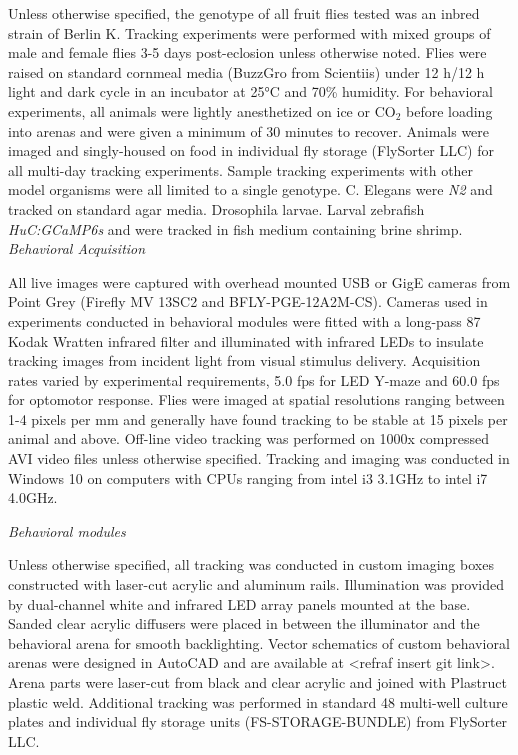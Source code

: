 \documentclass[10pt]{article}
\begin{document}
\begin{multicols}{2}
Unless otherwise specified, the genotype of all fruit flies tested was an inbred strain of  Berlin K. Tracking experiments were performed with mixed groups of male and female flies 3-5 days post-eclosion unless otherwise noted.  Flies were raised on standard cornmeal media (BuzzGro from Scientiis) under 12 h/12 h light and dark cycle in an incubator at 25°C and 70\% humidity. For behavioral experiments, all animals were lightly anesthetized on ice or CO$_2$ before loading into arenas and were given a minimum of 30 minutes to recover. Animals were imaged and singly-housed on food in individual fly storage (FlySorter LLC) for all multi-day tracking experiments. Sample tracking experiments with other model organisms were all limited to a single genotype. C. Elegans were \textit{N2} and tracked on standard agar media. Drosophila larvae. Larval zebrafish \textit{HuC:GCaMP6s} and were tracked in fish medium containing brine shrimp.
\textit{Behavioral Acquisition}

All live images were captured with overhead mounted USB or GigE cameras from Point Grey (Firefly MV 13SC2 and BFLY-PGE-12A2M-CS). Cameras used in experiments conducted in behavioral modules were fitted with a long-pass 87 Kodak Wratten infrared filter and illuminated with infrared LEDs to insulate tracking images from incident light from visual stimulus delivery. Acquisition rates varied by experimental requirements, 5.0 fps for LED Y-maze and 60.0 fps for optomotor response. Flies were imaged at spatial resolutions ranging between 1-4 pixels per mm and generally have found tracking to be stable at 15 pixels per animal and above.  Off-line video tracking was performed on 1000x compressed AVI video files unless otherwise specified. Tracking and imaging was conducted in Windows 10 on computers with CPUs ranging from intel i3 3.1GHz to intel i7 4.0GHz. 

\textit{Behavioral modules}

Unless otherwise specified, all tracking was conducted in custom imaging boxes constructed with laser-cut acrylic and aluminum rails. Illumination was provided by dual-channel white and infrared LED array panels mounted at the base. Sanded clear acrylic diffusers were placed in between the illuminator and the behavioral arena for smooth backlighting. Vector schematics of custom behavioral arenas were designed in AutoCAD and are available at <refraf insert git link>. Arena parts were laser-cut from black and clear acrylic and joined with Plastruct plastic weld. Additional tracking was performed in standard 48 multi-well culture plates and individual fly storage units (FS-STORAGE-BUNDLE) from FlySorter LLC.


\end{multicols}
\end{document}
